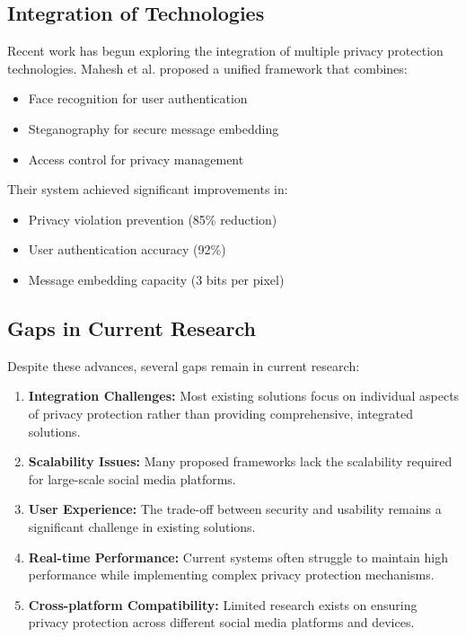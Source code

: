 \documentclass[pdflatex,sn-mathphys-num]{sn-jnl}%
\theoremstyle{thmstyleone}%
\theoremstyle{thmstyletwo}%
\theoremstyle{thmstylethree}%
\begin{document}
\subsection{Integration of Technologies}

Recent work has begun exploring the integration of multiple privacy protection technologies. Mahesh et al. \cite{mahesh2021trust} proposed a unified framework that combines:
\begin{itemize}
    \item Face recognition for user authentication
    \item Steganography for secure message embedding
    \item Access control for privacy management
\end{itemize}

Their system achieved significant improvements in:
\begin{itemize}
    \item Privacy violation prevention (85\% reduction)
    \item User authentication accuracy (92\%)
    \item Message embedding capacity (3 bits per pixel)
\end{itemize}

\subsection{Gaps in Current Research}

Despite these advances, several gaps remain in current research:

\begin{enumerate}
    \item \textbf{Integration Challenges:} Most existing solutions focus on individual aspects of privacy protection rather than providing comprehensive, integrated solutions.
    
    \item \textbf{Scalability Issues:} Many proposed frameworks lack the scalability required for large-scale social media platforms.
    
    \item \textbf{User Experience:} The trade-off between security and usability remains a significant challenge in existing solutions.
    
    \item \textbf{Real-time Performance:} Current systems often struggle to maintain high performance while implementing complex privacy protection mechanisms.
    
    \item \textbf{Cross-platform Compatibility:} Limited research exists on ensuring privacy protection across different social media platforms and devices.
\end{enumerate}
\end{document}
